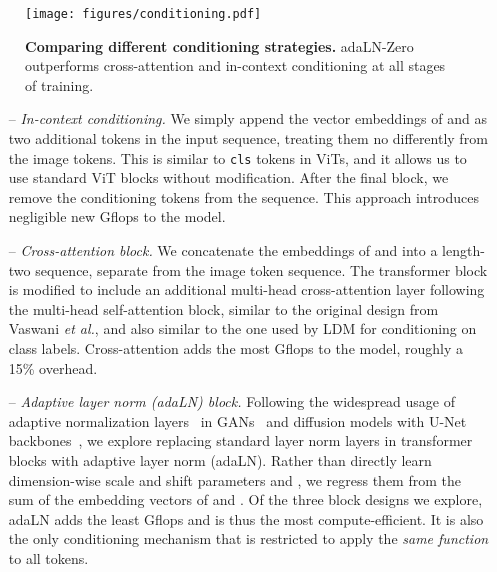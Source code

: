 \documentclass[10pt,twocolumn,letterpaper]{article}
\makeatletter
\def\etal{\emph{et al.}\@\xspace}
\makeatother
\begin{document}
\begin{figure}\centering
\texttt{[image: figures/conditioning.pdf]}
\caption{\textbf{Comparing different conditioning strategies.} adaLN-Zero outperforms cross-attention and in-context conditioning at all stages of training.}\vspace{-4mm}
\label{fig:conditioning}
\end{figure}

\begin{itemize}
\item[--] \textit{In-context conditioning.} We simply append the vector embeddings of  and  as two additional tokens in the input sequence, treating them no differently from the image tokens. This is similar to \texttt{cls} tokens in ViTs, and it allows us to use standard ViT blocks without modification. After the final block, we remove the conditioning tokens from the sequence. This approach introduces negligible new Gflops to the model.

\item[--] \textit{Cross-attention block.} We concatenate the embeddings of  and  into a length-two sequence, separate from the image token sequence. The transformer block is modified to include an additional multi-head cross-attention layer following the multi-head self-attention block, similar to the original design from Vaswani \etal \cite{Vaswani2017}, and also similar to the one used by LDM for conditioning on class labels. Cross-attention adds the most Gflops to the model, roughly a 15\% overhead.

\item[--] \textit{Adaptive layer norm (adaLN) block.} Following the widespread usage of adaptive normalization layers~\cite{perez2018film} in GANs~\cite{brock2018large,karras2019style} and diffusion models with U-Net backbones~\cite{dhariwal2021adm}, we explore replacing standard layer norm layers in transformer blocks with adaptive layer norm (adaLN). Rather than directly learn dimension-wise scale and shift parameters  and , we regress them from the sum of the embedding vectors of  and . Of the three block designs we explore, adaLN adds the least Gflops and is thus the most compute-efficient. It is also the only conditioning mechanism that is restricted to apply the \emph{same function} to all tokens.


\end{itemize}
\end{document}
